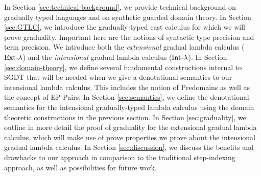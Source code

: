 In Section \ref{sec:technical-background}, we provide technical background on gradually typed languages and
on synthetic guarded domain theory.
% 
In Section \ref{sec:GTLC}, we introduce the gradually-typed cast calculus
for which we will prove graduality. Important here are the notions of syntactic
type precision and term precision. We introduce both the \emph{extensional} gradual lambda calculus
($\text{Ext-}\lambda$) and the \emph{intensional} gradual lambda calculus ($\text{Int-}\lambda$).
%
In Section \ref{sec:domain-theory}, we define several fundamental constructions
internal to SGDT that will be needed when we give a denotational semantics to
our intensional lambda calculus.
This includes the notion of Predomains as well as the concept
of EP-Pairs.
%
In Section \ref{sec:semantics}, we define the denotational semantics for the
intensional gradually-typed lambda calculus using the domain theoretic constructions in the
previous section.
%
In Section \ref{sec:graduality}, we outline in more detail the proof of graduality for the
extensional gradual lambda calculus, which will make use of prove properties we prove about
 the intensional gradual lambda calculus.
%
In Section \ref{sec:discussion}, we discuss the benefits and drawbacks to our approach in comparison
to the traditional step-indexing approach, as well as possibilities for future work.

